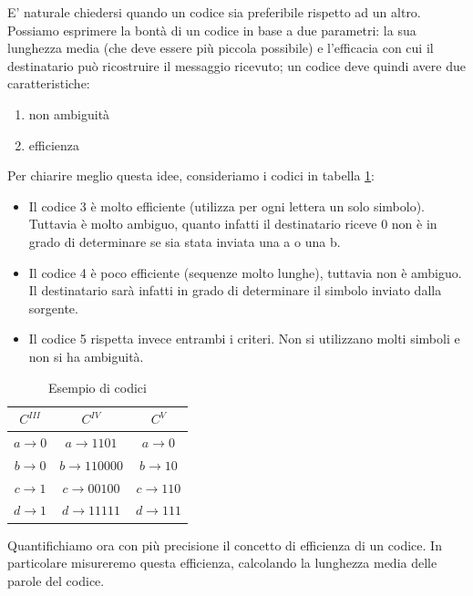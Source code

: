 E' naturale chiedersi quando un codice sia preferibile rispetto ad un altro.
Possiamo esprimere la bontà di un codice in base a due parametri: la sua lunghezza media (che deve essere più piccola possibile) e l'efficacia con cui il destinatario può ricostruire il messaggio ricevuto; un codice deve quindi avere due caratteristiche:
\begin{enumerate}
\item non ambiguità
\item efficienza
\end{enumerate}

Per chiarire meglio questa idee, consideriamo i codici in tabella \ref{tab:codici2}: 
\begin{itemize}
 \item Il codice 3 è molto efficiente (utilizza per ogni lettera un solo simbolo). Tuttavia è molto ambiguo, quanto infatti
 il destinatario riceve 0 non è in grado di determinare se sia stata inviata una a o una b.
 \item Il codice 4 è poco efficiente (sequenze molto lunghe), tuttavia non è ambiguo. Il destinatario sarà infatti in grado di 
determinare il simbolo inviato dalla sorgente.
 \item Il codice 5 rispetta invece entrambi i criteri. Non si utilizzano molti simboli e non si ha ambiguità.
\end{itemize}

\begin{table}[htbp]
  \begin{center}
   \begin{tabular}{c|c|c}
	$C^{III}$ & $C^{IV}$ & $C^{V}$\\
       \hline
	$a \to 0$ & $a \to 1101$ & $a \to 0$ \\ 
	$b \to 0$ & $b \to 110000$ & $b \to 10$ \\ 
	$c \to 1$ & $c \to 00100$ & $c \to 110$ \\ 
        $d \to 1$ & $d \to 11111$ & $d \to 111$ \\ 
    \end{tabular}
     
     \caption{Esempio di codici}
    \label{tab:codici2}
  \end{center}
\end{table}

Quantifichiamo ora con più precisione il concetto di efficienza di un codice.
In particolare misureremo questa efficienza, calcolando la lunghezza media delle parole del codice.

